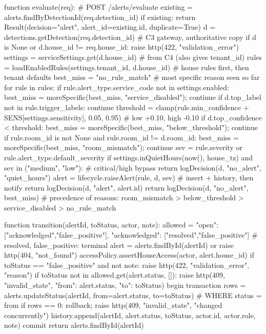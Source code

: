 
\begin{Shaded}
\begin{Code}
function evaluate(req):                                   # POST /alerts/evaluate
    existing = alerts.findByDetectionId(req.detection_id)
    if existing: return Result(decision="alert", alert_id=existing.id, duplicate=True)
    d = detections.getDetection(req.detection_id)          # C3 gateway, authoritative copy
    if d is None or d.house_id != req.house_id: raise http(422, "validation_error")
    settings = serviceSettings.get(d.house_id)               # from C4 (also gives tenant_id)
    rules    = loadEnabledRules(settings.tenant_id, d.house_id)  # house rules first, then tenant defaults
    best_miss = "no_rule_match"                              # most specific reason seen so far
    for rule in rules:
        if rule.alert_type.service_code not in settings.enabled:
            best_miss = moreSpecific(best_miss, "service_disabled"); continue
        if d.top_label not in rule.trigger_labels: continue
        threshold = clamp(rule.min_confidence + SENS[settings.sensitivity], 0.05, 0.95)  # low +0.10, high -0.10
        if d.top_confidence < threshold:
            best_miss = moreSpecific(best_miss, "below_threshold"); continue
        if rule.room_id is not None and rule.room_id != d.room_id:
            best_miss = moreSpecific(best_miss, "room_mismatch"); continue
        sev = rule.severity or rule.alert_type.default_severity
        if settings.inQuietHours(now(), house_tz) and sev in ("medium", "low"):  # critical/high bypass
            return logDecision(d, "no_alert", "quiet_hours")
        alert = lifecycle.raiseAlert(rule, d, sev)            # insert + history, then notify
        return logDecision(d, "alert", alert.id)
    return logDecision(d, "no_alert", best_miss)
# precedence of reasons: room_mismatch > below_threshold > service_disabled > no_rule_match

function transition(alertId, toStatus, actor, note):
    allowed = { "open": ["acknowledged","false_positive"],
                "acknowledged": ["resolved","false_positive"] }  # resolved, false_positive: terminal
    alert = alerts.findById(alertId) or raise http(404, "not_found")
    accessPolicy.assertHouseAccess(actor, alert.house_id)
    if toStatus == "false_positive" and not note: raise http(422, "validation_error", "reason")
    if toStatus not in allowed.get(alert.status, []):
        raise http(409, "invalid_state", {"from": alert.status, "to": toStatus})
    begin transaction
        rows = alerts.updateStatus(alertId, from=alert.status, to=toStatus)  # WHERE status = from
        if rows == 0: rollback; raise http(409, "invalid_state", "changed concurrently")
        history.append(alertId, alert.status, toStatus, actor.id, actor.role, note)
    commit
    return alerts.findById(alertId)


\end{Code}
\end{Shaded}
